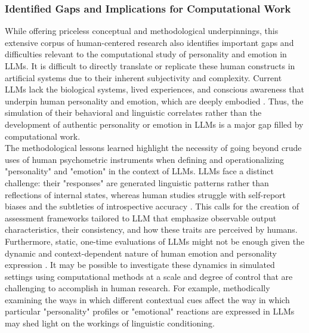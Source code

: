 \documentclass{DESSThesis}
\begin{document}
\subsubsection{Identified Gaps and Implications for Computational Work}
While offering priceless conceptual and methodological underpinnings, this extensive corpus of human-centered research also identifies important gaps and difficulties relevant to the computational study of personality and emotion in LLMs. It is difficult to directly translate or replicate these human constructs in artificial systems due to their inherent subjectivity and complexity. Current LLMs lack the biological systems, lived experiences, and conscious awareness that underpin human personality and emotion, which are deeply embodied \cite{paul_towards_2020,nummenmaa_bodily_2014}. Thus, the simulation of their behavioral and linguistic correlates rather than the development of authentic personality or emotion in LLMs is a major gap filled by computational work.
\\
The methodological lessons learned highlight the necessity of going beyond crude uses of human psychometric instruments when defining and operationalizing "personality" and "emotion" in the context of LLMs. LLMs face a distinct challenge: their "responses" are generated linguistic patterns rather than reflections of internal states, whereas human studies struggle with self-report biases and the subtleties of introspective accuracy \cite{cobb-clark_stability_2012,paul_towards_2020}. This calls for the creation of assessment frameworks tailored to LLM that emphasize observable output characteristics, their consistency, and how these traits are perceived by humans.
\\
Furthermore, static, one-time evaluations of LLMs might not be enough given the dynamic and context-dependent nature of human emotion and personality expression \cite{hochschild_emotion_1979,van_kleef_how_2009}. It may be possible to investigate these dynamics in simulated settings using computational methods at a scale and degree of control that are challenging to accomplish in human research. For example, methodically examining the ways in which different contextual cues affect the way in which particular "personality" profiles or "emotional" reactions are expressed in LLMs may shed light on the workings of linguistic conditioning.
\\
\end{document}
